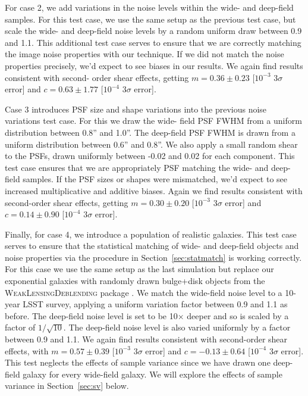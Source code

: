 \documentclass[twocolumn]{openjournal}
\makeatletter
\newcommand{\descwl}{\textsc{WeakLensingDeblending}\@\xspace}
\makeatother
\begin{document}
For case 2, we add variations in the noise levels within the wide- and deep-field
samples. For this test case, we use the same setup as the previous test case, but scale
the wide- and deep-field noise levels by a random uniform draw between 0.9 and 1.1. This
additional test case serves to ensure that we are correctly matching the image noise
properties with our technique. If we did not match the noise properties precisely, we'd
expect to see biases in our results. We again find results consistent with second- order
shear effects, getting $m=0.36\pm0.23$ [$10^{-3}$ $3\sigma$ error] and $c=0.63\pm1.77$
[$10^{-4}$ $3\sigma$ error].

Case 3 introduces PSF size and shape variations into the previous noise variations test
case. For this we draw the wide- field PSF FWHM from a uniform distribution between
0.8'' and 1.0''. The deep-field PSF FWHM is drawn from a uniform distribution between
0.6'' and 0.8''. We also apply a small random shear to the PSFs, drawn uniformly
between -0.02 and 0.02 for each component. This test case ensures that we are appropriately PSF matching the
wide- and deep-field samples. If the PSF sizes or shapes were mismatched, we'd expect to
see increased multiplicative and additive biases. Again we find results consistent with
second-order shear effects, getting $m=0.30\pm0.20$ [$10^{-3}$ $3\sigma$ error] and
$c=0.14\pm0.90$ [$10^{-4}$ $3\sigma$ error].

Finally, for case 4, we introduce a population of realistic galaxies. This test case
serves to ensure that the statistical matching of wide- and deep-field objects and noise
properties via the procedure in Section~\ref{sec:statmatch} is working correctly. For
this case we use the same setup as the last simulation but replace our exponential
galaxies with randomly drawn bulge+disk objects from the \descwl package
\citep{WeakLensingDeblendingPaper,WeakLensingDeblendingSoftware} . We match the
wide-field noise level to a 10-year LSST survey, applying a uniform variation factor
between 0.9 and 1.1 as before. The deep-field noise level is set to be 10$\times$ deeper
and so is scaled by a factor of $1/\sqrt{10}$. The deep-field noise level is also varied
uniformly by a factor between 0.9 and 1.1. We again find results consistent with
second-order shear effects, with $m=0.57\pm0.39$ [$10^{-3}$ $3\sigma$ error] and
$c=-0.13\pm0.64$ [$10^{-4}$ $3\sigma$ error]. This test neglects the effects of sample
variance since we have drawn one deep-field galaxy for every wide-field galaxy. We will
explore the effects of sample variance in Section~\ref{sec:sv} below.
\end{document}
